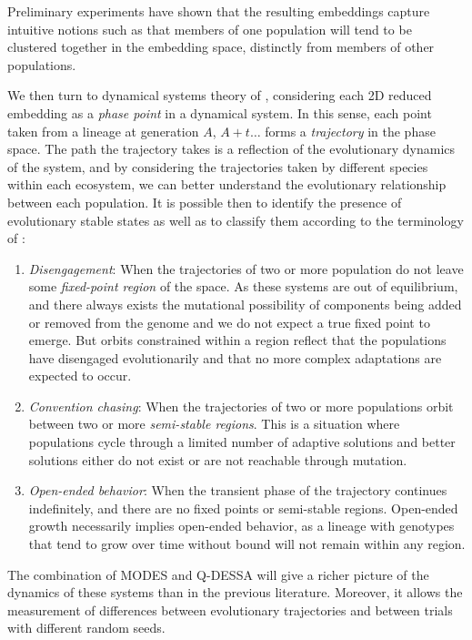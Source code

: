 \documentclass{article}
\begin{document}
Preliminary experiments have shown that the resulting embeddings capture intuitive notions such as that 
members of one population will tend to be clustered together in the embedding space, distinctly
from members of other populations.

We then turn to dynamical systems theory of \citet{strogatz:2000}, considering each 2D reduced
embedding as a \textit{phase point} in a dynamical system. In this sense, each point taken from a lineage 
at generation
$A$, $A + t\dots$ forms a \textit{trajectory} in the phase space. The path the trajectory takes is a
reflection of the evolutionary dynamics of the system, and by considering the trajectories taken
by different species within each ecosystem, we can better understand the evolutionary relationship
between each population. It is possible then to identify the presence of evolutionary stable
states as well as to classify them according to the terminology of \citet{watson2001coevolutionary}:

\begin{enumerate}
    \item \textit{Disengagement}: When the trajectories of two or more population do not leave some 
        \textit{fixed-point region} of the space. As these systems are out of equilibrium, and
        there always exists the mutational possibility of components being added or removed from
        the genome and we do not expect a true fixed point to emerge. But orbits constrained within
        a region reflect that the populations have disengaged evolutionarily and that no more 
        complex adaptations are expected to occur.
    \item \textit{Convention chasing}: When the trajectories of two or more populations orbit between two
        or more \textit{semi-stable regions}. This is a situation where populations cycle through a limited 
        number of adaptive solutions and better solutions either do not exist or are
        not reachable through mutation. 
    \item \textit{Open-ended behavior}: When the transient phase of the trajectory continues indefinitely,
        and there are no fixed points or semi-stable regions. Open-ended growth necessarily implies
        open-ended behavior, as a lineage with genotypes that tend to grow over time without 
        bound will not remain within any region.
\end{enumerate}

The combination of MODES and Q-DESSA will give a richer picture of the dynamics of these 
systems than in the previous literature. Moreover, it allows the measurement of differences between 
evolutionary trajectories and between trials with different random seeds. 
\end{document}
